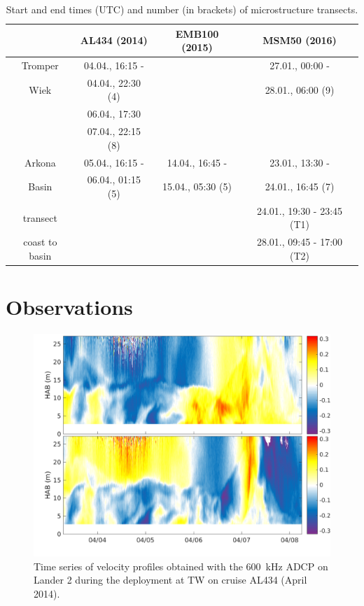  \begin{table}
\caption{Start and end times (UTC) and number (in brackets) of microstructure 
transects.}\label{mss}
\begin{center}
\begin{tabular}{cccc}
 & AL434 (2014) & EMB100 (2015) & MSM50 (2016)\\
 \hline
Tromper & 04.04., 16:15 - & & 27.01., 00:00 - \\ 
Wiek & 04.04., 22:30 (4) & & 28.01., 06:00 (9)\\
 & 06.04., 17:30 & & \\
 &  07.04., 22:15 (8) & & \\
\hline
Arkona & 05.04., 16:15 - & 14.04., 16:45 - & 23.01., 13:30 - \\
Basin & 06.04., 01:15 (5) & 15.04., 05:30 (5) & 24.01., 16:45 (7)\\
\hline
transect &  & & 24.01., 19:30 - 23:45 (T1)\\
coast to basin & & & 28.01., 09:45 - 17:00 (T2)\\
\end{tabular}
\end{center}
\end{table}

\section{Observations}

 \begin{figure}[ht]
\includegraphics[width=40pc]{bilder/adcp600.png}
 \caption{Time series of velocity profiles obtained with the 600~kHz ADCP on 
Lander 2 during the deployment at TW on cruise AL434 (April 2014).}
 \label{adcp600}
 \end{figure}

